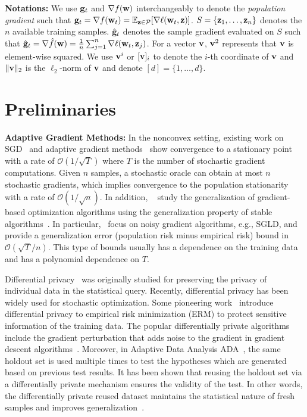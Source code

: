 \documentclass[11pt]{article}
\begin{document}
\textbf{Notations:} 
We use $\mathbf{g}_t$ and $\nabla f(\mathbf{w})$ interchangeably to denote the \emph{population gradient} such that $\g_t = \nabla f(\w_t) = \mathbb{E}_{\z \in \cP} [\nabla \ell(\w_t, \z)]$. 
$S = \left\{\mathbf{z}_{1}, \dots, \mathbf{z}_{n}\right\}$ denotes the $n$ available training samples. 
$\hat {\mathbf{g}}_t$ denotes the sample gradient evaluated on $S$ such that $\hat {\mathbf{g}}_t = \nabla \hat f(\mathbf{w}) = \frac{1}{n}\sum_{j=1}^n \nabla \ell(\mathbf{w}_t, \mathbf{z}_j)$. For a vector $\mathbf{v}$, $\mathbf{v}^2$ represents that $\mathbf{v}$ is element-wise squared.  
We use $\mathbf{v}^i$ or $[\mathbf{v}]_i$ to denote the $i$-th coordinate of $\mathbf{v}$ and $\|\mathbf{v}\|_2$ is the $\ell_2$-norm of $\mathbf{v}$ and denote $[d]=\{1,\dots,d\}$.


\section{Preliminaries}


{\bf Adaptive Gradient Methods:} 
In the nonconvex setting, existing work on SGD~\citep{Article:Ghadimi_SJO13} and adaptive gradient methods~\citep{Proc:Zaheer_NeurIPS18, Proc:Ward_ICML19, Proc:Zou_CVPR19, Proc:Chen_ICLR19} show convergence to a stationary point with a rate of  $\mathcal{O}(1/\sqrt{T})$ where $T$ is the number of stochastic gradient computations. Given $n$ samples, a stochastic oracle can obtain at most $n$ stochastic gradients, which implies convergence to the population stationarity with a rate of $\mathcal{O}(1/\sqrt{n})$.
In addition, ~\citep{Proc:Kuzborskij_ICML18, Proc:Raginsky_COLT17, Proc:Hardt_ICML16,Proc:Mou_COLT18, Proc:Pensia_ISIT18, Proc:Chen_ICLR19, Proc:Li_ICLR20} study the generalization of gradient-based optimization algorithms using the generalization property of stable algorithms~\cite{boel02}. 
In particular,~\citep{Proc:Raginsky_COLT17, Proc:Mou_COLT18, Proc:Li_ICLR20, Proc:Pensia_ISIT18} focus on noisy gradient algorithms, e.g., \textsc{SGLD}, and provide a generalization error (population risk minus empirical risk) bound in $\mathcal{O}(\sqrt{T}/n)$. 
This type of bounds usually has a dependence on the training data and has a polynomial dependence on $T$.  


Differential privacy~\cite{Article:Dwork_2014} was originally studied for preserving the privacy of individual data in the statistical query. 
Recently, differential privacy has been widely used for stochastic optimization. 
Some pioneering work~\citep{chmo2011, basm2014, waye2017} introduce differential privacy to empirical risk minimization (ERM) to protect sensitive information of the training data. 
The popular differentially private algorithms include the gradient perturbation that adds noise to the gradient in gradient descent algorithms~\citep{chmo2011,basm2014,waxu2019}.
Moreover, in Adaptive Data Analysis \textsc{ADA}~\citep{Proc:Dwork_NIPS15,dwfe2015b,Proc:Dwork_STOC15}, the same holdout set is used multiple times to test the hypotheses which are generated based on previous test results.
It has been shown that reusing the holdout set via a differentially private mechanism ensures the validity of the test. 
In other words, the differentially private reused dataset maintains the statistical nature of fresh samples and improves generalization~\citep{zhch2018}. 
\end{document}
